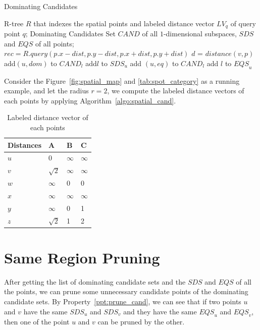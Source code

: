 \begin{algorithm}[H]
  \caption{Dominating Candidates}
  \label{algo:spatial_cand}
  \begin{algorithmic}[1]
  \show\LOOP
    \REQUIRE R-tree $R$ that indexes the spatial points and labeled distance vector $LV_q$ of query point $q$;
    \ENSURE Dominating Candidates Set $\mathit{CAND}$ of all $1$-dimensional subspaces, $\mathit{SDS}$ and $\mathit{EQS}$ of all points;
            \STATE $rec = R.query(p.x-dist, p.y-dist, p.x+dist, p.y+dist)$
                \STATE $d$ = $distance(v, p)$
                    \STATE add$(u, dom)$ to $\mathit{CAND}_l$
                    \STATE add$l$ to $\mathit{SDS}_u$
                \ENDIF
                    \STATE add $(u, eq)$ to $\mathit{CAND}_l$
                    \STATE add $l$ to $\mathit{EQS}_u$
                \ENDIF
            \ENDFOR
            
        \ENDFOR
    \ENDFOR
  \end{algorithmic}
\end{algorithm}

Consider the Figure~\ref{fig:spatial_map} and \ref{tab:spot_category} as a running example, and let the radius $r = 2$, we compute the labeled distance vectors of each points by applying Algorithm~\ref{algo:spatial_cand}.

\begin{table}[h]
    \centering
    \begin{tabular}{llll}
    \hline
    Distances & A & B & C \\ \hline
    $u$       & 0 & $\infty$ & $\infty$ \\ \hline
    $v$       & $\sqrt{2}$ & $\infty$ & $\infty$ \\ \hline
    $w$       & $\infty$ & 0 & 0 \\ \hline
    $x$       & $\infty$ & $\infty$ & $\infty$ \\ \hline
    $y$       & $\infty$ & 0 & 1 \\ \hline
    $z$       & $\sqrt{2}$ & 1 & 2 \\ \hline
    \end{tabular}
    \caption{Labeled distance vector of each points}
    \label{tab:lv_spatial}
\end{table}

\section{Same Region Pruning}
After getting the list of dominating candidate sets and the $\mathit{SDS}$ and $\mathit{EQS}$ of all the points, we can prune some unnecessary candidate points of the dominating candidate sets. By Property~\ref{ppt:prune_cand}, we can see that if two points $u$ and $v$ have the same $\mathit{SDS}_u$ and $\mathit{SDS}_v$ and they have the same $\mathit{EQS}_u$ and $\mathit{EQS}_v$, then one of the point $u$ and $v$ can be pruned by the other.

